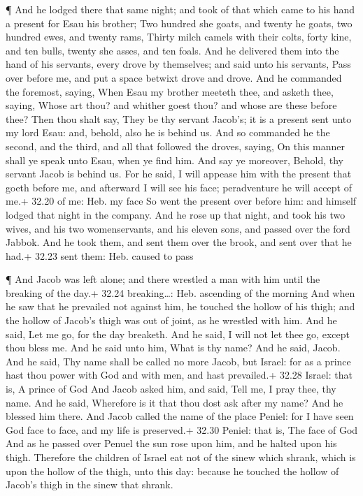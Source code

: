  ¶ And he lodged there that same night; and took of that
which came to his hand a present for Esau his brother;  Two
hundred she goats, and twenty he goats, two hundred ewes, and twenty
rams,  Thirty milch camels with their colts, forty kine,
and ten bulls, twenty she asses, and ten foals.  And he
delivered them into the hand of his servants, every drove by themselves;
and said unto his servants, Pass over before me, and put a space betwixt
drove and drove.  And he commanded the foremost, saying,
When Esau my brother meeteth thee, and asketh thee, saying, Whose art
thou? and whither goest thou? and whose are these before thee?
 Then thou shalt say, They be thy servant Jacob's; it is a
present sent unto my lord Esau: and, behold, also he is behind us.
 And so commanded he the second, and the third, and all
that followed the droves, saying, On this manner shall ye speak unto
Esau, when ye find him.  And say ye moreover, Behold, thy
servant Jacob is behind us. For he said, I will appease him with the
present that goeth before me, and afterward I will see his face;
peradventure he will accept of me.+ 32.20 of me: Heb. my face
 So went the present over before him: and himself lodged
that night in the company.  And he rose up that night, and
took his two wives, and his two womenservants, and his eleven sons, and
passed over the ford Jabbok.  And he took them, and sent
them over the brook, and sent over that he had.+ 32.23 sent them: Heb.
caused to pass

 ¶ And Jacob was left alone; and there wrestled a man with
him until the breaking of the day.+ 32.24 breaking\ldots: Heb. ascending
of the morning  And when he saw that he prevailed not
against him, he touched the hollow of his thigh; and the hollow of
Jacob's thigh was out of joint, as he wrestled with him. 
And he said, Let me go, for the day breaketh. And he said, I will not
let thee go, except thou bless me.  And he said unto him,
What is thy name? And he said, Jacob.  And he said, Thy
name shall be called no more Jacob, but Israel: for as a prince hast
thou power with God and with men, and hast prevailed.+ 32.28 Israel:
that is, A prince of God  And Jacob asked him, and said,
Tell me, I pray thee, thy name. And he said, Wherefore is it that thou
dost ask after my name? And he blessed him there.  And
Jacob called the name of the place Peniel: for I have seen God face to
face, and my life is preserved.+ 32.30 Peniel: that is, The face of God
 And as he passed over Penuel the sun rose upon him, and he
halted upon his thigh.  Therefore the children of Israel
eat not of the sinew which shrank, which is upon the hollow of the
thigh, unto this day: because he touched the hollow of Jacob's thigh in
the sinew that shrank.

